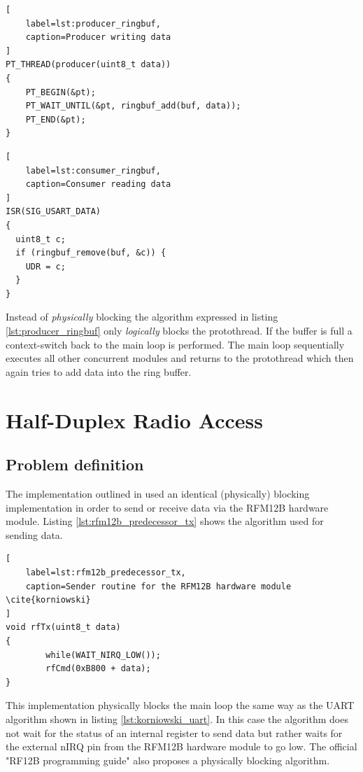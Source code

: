 \begin{lstlisting}[
    label=lst:producer_ringbuf,
    caption=Producer writing data
]
PT_THREAD(producer(uint8_t data))
{
    PT_BEGIN(&pt);
    PT_WAIT_UNTIL(&pt, ringbuf_add(buf, data));
    PT_END(&pt);
}
\end{lstlisting}

\begin{lstlisting}[
    label=lst:consumer_ringbuf,
    caption=Consumer reading data
]
ISR(SIG_USART_DATA)
{
  uint8_t c;
  if (ringbuf_remove(buf, &c)) {
    UDR = c;
  }
}
\end{lstlisting}

Instead of \emph{physically} blocking the algorithm expressed in listing \ref{lst:producer_ringbuf} only \emph{logically} blocks the protothread. If the buffer is full a context-switch back to the main loop is performed. The main loop sequentially executes all other concurrent modules and returns to the protothread which then again tries to add data into the ring buffer.

\section{Half-Duplex Radio Access}%
\label{sec:petri}
\subsection{Problem definition} %
The implementation outlined in \cite{korniowski} used an identical (physically) blocking implementation in order to send or receive data via the RFM12B hardware module. Listing \ref{lst:rfm12b_predecessor_tx} shows the algorithm used for sending data.

\begin{lstlisting}[
    label=lst:rfm12b_predecessor_tx,
    caption=Sender routine for the RFM12B hardware module \cite{korniowski}
]
void rfTx(uint8_t data)
{
        while(WAIT_NIRQ_LOW());
        rfCmd(0xB800 + data);
}
\end{lstlisting}

This implementation physically blocks the main loop the same way as the UART algorithm shown in listing \ref{lst:korniowski_uart}. In this case the algorithm does not wait for the status of an internal register to send data but rather waits for the external nIRQ pin from the RFM12B hardware module to go low. The official "RF12B programming guide" \cite{rf12b_programming_guide} also proposes a physically blocking algorithm.

